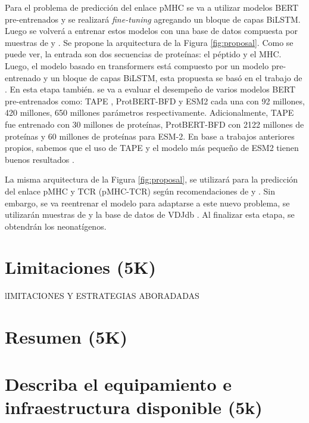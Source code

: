 \documentclass[a4paper,11pt]{article}
\begin{document}
Para el problema de predicción del enlace pMHC se va a utilizar modelos BERT pre-entrenados y se realizará \textit{fine-tuning} agregando un bloque de capas BiLSTM. Luego se volverá a entrenar estos modelos con una base de datos compuesta por muestras de \cite{zhang2022hlab} y \cite{gfeller2023improved}. Se propone la arquitectura de la Figura \ref{fig:proposal}. Como se puede ver, la entrada son dos secuencias de proteínas: el péptido y el MHC. Luego, el modelo basado en transformers está compuesto por un modelo pre-entrenado y un bloque de capas BiLSTM, esta propuesta se basó en el trabajo de \cite{zhang2022hlab}. En esta etapa también. se va a evaluar el desempeño de varios modelos BERT pre-entrenados como: TAPE \cite{rao2019evaluating}, ProtBERT-BFD \cite{elnaggar2021prottrans} y ESM2 \cite{lin2023evolutionary} cada una con 92 millones, 420 millones, 650 millones parámetros respectivamente. Adicionalmente, TAPE fue entrenado con 30 millones de proteínas, ProtBERT-BFD con 2122 millones de proteínas y 60 millones de proteínas para ESM-2. En base a trabajos anteriores propios, sabemos que el uso de TAPE y el modelo más pequeño de ESM2 tienen buenos resultados \cite{arceda2023neoantigen}.



La misma arquitectura de la Figura \ref{fig:proposal}, se utilizará para la predicción del enlace pMHC y TCR (pMHC-TCR) según recomendaciones de \cite{li2020progeo}  y \cite{myronov2023bertrand}. Sin embargo, se va reentrenar el modelo para adaptarse a este nuevo problema, se utilizarán muestras de \cite{li2020progeo} y la base de datos de VDJdb \cite{shugay2018vdjdb}. Al finalizar esta etapa, se obtendrán los neonatígenos.





\section{Limitaciones (5K)}

lIMITACIONES Y ESTRATEGIAS ABORADADAS


\section{Resumen (5K)}


\section{Describa el equipamiento e infraestructura disponible (5k)}
\end{document}
